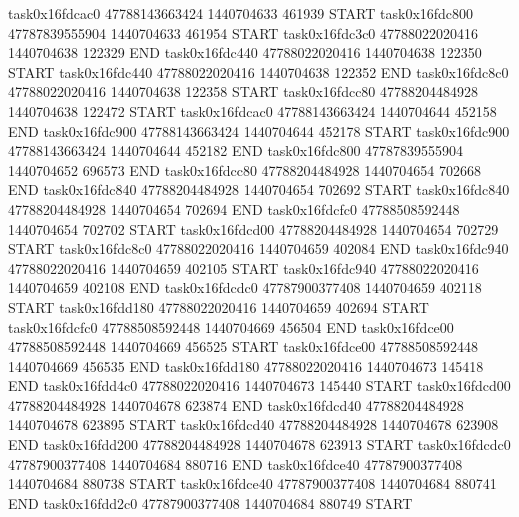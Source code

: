task0x16fdcac0 47788143663424          1440704633               461939  START
task0x16fdc800 47787839555904          1440704633               461954  START
task0x16fdc3c0 47788022020416          1440704638               122329  END
task0x16fdc440 47788022020416          1440704638               122350  START
task0x16fdc440 47788022020416          1440704638               122352  END
task0x16fdc8c0 47788022020416          1440704638               122358  START
task0x16fdcc80 47788204484928          1440704638               122472  START
task0x16fdcac0 47788143663424          1440704644               452158  END
task0x16fdc900 47788143663424          1440704644               452178  START
task0x16fdc900 47788143663424          1440704644               452182  END
task0x16fdc800 47787839555904          1440704652               696573  END
task0x16fdcc80 47788204484928          1440704654               702668  END
task0x16fdc840 47788204484928          1440704654               702692  START
task0x16fdc840 47788204484928          1440704654               702694  END
task0x16fdcfc0 47788508592448          1440704654               702702  START
task0x16fdcd00 47788204484928          1440704654               702729  START
task0x16fdc8c0 47788022020416          1440704659               402084  END
task0x16fdc940 47788022020416          1440704659               402105  START
task0x16fdc940 47788022020416          1440704659               402108  END
task0x16fdcdc0 47787900377408          1440704659               402118  START
task0x16fdd180 47788022020416          1440704659               402694  START
task0x16fdcfc0 47788508592448          1440704669               456504  END
task0x16fdce00 47788508592448          1440704669               456525  START
task0x16fdce00 47788508592448          1440704669               456535  END
task0x16fdd180 47788022020416          1440704673               145418  END
task0x16fdd4c0 47788022020416          1440704673               145440  START
task0x16fdcd00 47788204484928          1440704678               623874  END
task0x16fdcd40 47788204484928          1440704678               623895  START
task0x16fdcd40 47788204484928          1440704678               623908  END
task0x16fdd200 47788204484928          1440704678               623913  START
task0x16fdcdc0 47787900377408          1440704684               880716  END
task0x16fdce40 47787900377408          1440704684               880738  START
task0x16fdce40 47787900377408          1440704684               880741  END
task0x16fdd2c0 47787900377408          1440704684               880749  START
